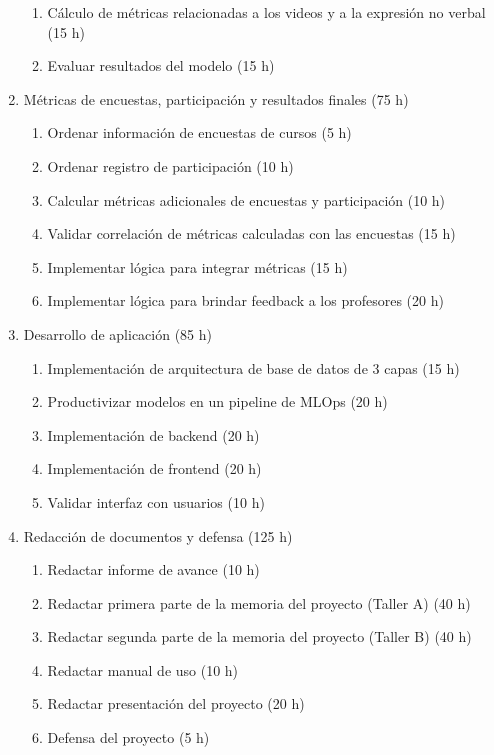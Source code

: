 \documentclass[
11pt, %
codirector, %
]{charter}
\begin{document}
\begin{enumerate}
\begin{enumerate}
    \item Cálculo de métricas relacionadas a los videos y a la expresión no verbal (15 h)
    \item Evaluar resultados del modelo (15 h)
    \end{enumerate}
\item Métricas de encuestas, participación y resultados finales (75 h)
    \begin{enumerate}
    \item Ordenar información de encuestas de cursos (5 h)
    \item Ordenar registro de participación (10 h)
    \item Calcular métricas adicionales de encuestas y participación (10 h)
    \item Validar correlación de métricas calculadas con las encuestas (15 h)
    \item Implementar lógica para integrar métricas (15 h)
    \item Implementar lógica para brindar feedback a los profesores (20 h)
    \end{enumerate}
\item Desarrollo de aplicación (85 h)
    \begin{enumerate}
    \item Implementación de arquitectura de base de datos de 3 capas (15 h)
    \item Productivizar modelos en un pipeline de MLOps (20 h)
    \item Implementación de backend (20 h)
    \item Implementación de frontend (20 h)
    \item Validar interfaz con usuarios (10 h)
    \end{enumerate}
\item Redacción de documentos y defensa (125 h)
    \begin{enumerate}
    \item Redactar informe de avance (10 h)
    \item Redactar primera parte de la memoria del proyecto (Taller A) (40 h)
    \item Redactar segunda parte de la memoria del proyecto (Taller B) (40 h)
    \item Redactar manual de uso (10 h)
    \item Redactar presentación del proyecto (20 h)
    \item Defensa del proyecto (5 h)
    \end{enumerate}
\end{enumerate}
\end{document}
